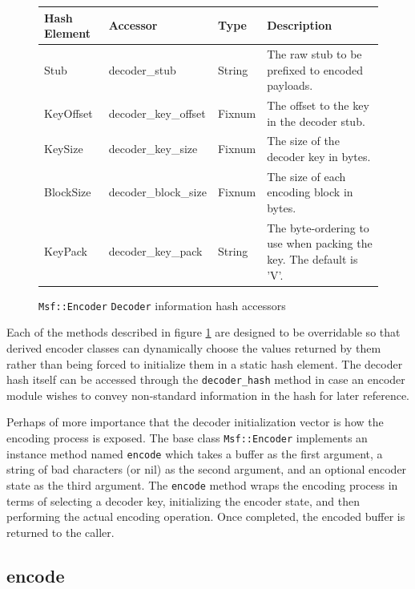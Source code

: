 \documentclass{report}
\begin{document}
\begin{figure}[h]
\begin{center}
\begin{tabular}{|l|l|l|p{2.0in}|}
\hline
\textbf{Hash Element} & \textbf{Accessor} & \textbf{Type} & \textbf{Description} \\
\hline
Stub & decoder\_stub & String & The raw stub to be prefixed to encoded payloads. \\
\hline
KeyOffset & decoder\_key\_offset & Fixnum & The offset to the key in the decoder stub. \\
\hline
KeySize & decoder\_key\_size & Fixnum & The size of the decoder key in bytes. \\
\hline
BlockSize & decoder\_block\_size & Fixnum & The size of each encoding block in bytes. \\
\hline
KeyPack & decoder\_key\_pack & String & The byte-ordering to use when packing the key.  The default is 'V'. \\
\hline
\end{tabular}
\caption{\texttt{Msf::Encoder} \texttt{Decoder} information hash
accessors} \label{fig-table-encoder-hash}
\end{center}
\end{figure}

\par
Each of the methods described in figure \ref{fig-table-encoder-hash}
are designed to be overridable so that derived encoder classes can
dynamically choose the values returned by them rather than being
forced to initialize them in a static hash element.  The decoder
hash itself can be accessed through the \texttt{decoder\_hash}
method in case an encoder module wishes to convey non-standard
information in the hash for later reference.

\par
Perhaps of more importance that the decoder initialization vector is
how the encoding process is exposed.  The base class
\texttt{Msf::Encoder} implements an instance method named
\texttt{encode} which takes a buffer as the first argument, a string
of bad characters (or nil) as the second argument, and an optional
encoder state as the third argument.  The \texttt{encode} method
wraps the encoding process in terms of selecting a decoder key,
initializing the encoder state, and then performing the actual
encoding operation.  Once completed, the encoded buffer is returned
to the caller.

        \subsection{encode}
\end{document}
